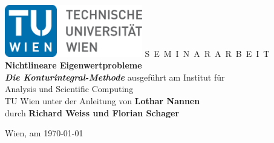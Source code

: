 \documentclass[a4paper,11pt,bibliography=totoc,listof=totoc,headinclude=true,cleardoublepage=empty]{scrbook}
\begin{document}

\begin{titlepage}
  \begin{center}
    \includegraphics[width=0.45\textwidth]{TULogo.eps}
    \vskip 1cm%
    {\LARGE S~\Large E~M~I~N~A~R~A~R~B~E~I~T}
    \vskip 8mm
    {\huge\bfseries\color{change}
    Nichtlineare Eigenwertprobleme \\
    \vspace{4pt}
    \normalsize
    \textit{Die Konturintegral-Methode}}
    \vskip 1cm
    \large
    ausgef\"uhrt am
    \vskip 0.75cm
    {\Large Institut f\"ur\\[1ex] Analysis und Scientific Computing}\\[1ex]
    {\Large TU Wien}
    \vskip0.75cm
    unter der Anleitung von
    \vskip0.75cm
    {\Large\bfseries\color{change}Lothar Nannen}\\[1ex]
    \vskip 0.5cm
    durch
    \vskip 0.5cm
    {\Large\bfseries\color{change}Richard Weiss
    und
    Florian Schager}
  \end{center}

  \vfill

  \small
  Wien, am {\color{change} \today} %
  \vspace*{-15mm}
\end{titlepage}

\cleardoublepage



\tableofcontents

\cleardoublepage
{}









\printbibliography
\end{document}

